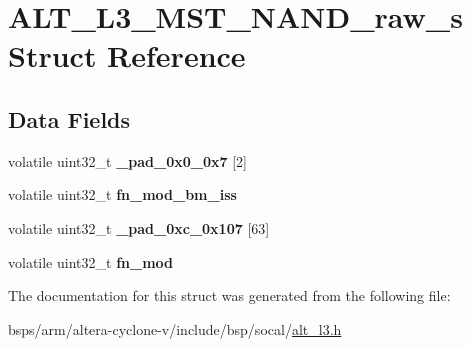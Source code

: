 \hypertarget{structALT__L3__MST__NAND__raw__s}{}\section{A\+L\+T\+\_\+\+L3\+\_\+\+M\+S\+T\+\_\+\+N\+A\+N\+D\+\_\+raw\+\_\+s Struct Reference}
\label{structALT__L3__MST__NAND__raw__s}
\subsection*{Data Fields}
\begin{DoxyCompactItemize}
\item 
\mbox{\label{structALT__L3__MST__NAND__raw__s_aea9acac62b14747cb77a1c8fa6cee2b5}} 
volatile uint32\+\_\+t {\bfseries \+\_\+pad\+\_\+0x0\+\_\+0x7} \mbox{[}2\mbox{]}
\item 
\mbox{\label{structALT__L3__MST__NAND__raw__s_ad0fd714104a0412529e4962d7c7ccb75}} 
volatile uint32\+\_\+t {\bfseries fn\+\_\+mod\+\_\+bm\+\_\+iss}
\item 
\mbox{\label{structALT__L3__MST__NAND__raw__s_aef45d7c0b5be119b68a8600c96d7f5ca}} 
volatile uint32\+\_\+t {\bfseries \+\_\+pad\+\_\+0xc\+\_\+0x107} \mbox{[}63\mbox{]}
\item 
\mbox{\label{structALT__L3__MST__NAND__raw__s_a242b4cb41770c9b950aa1fdf60f339f0}} 
volatile uint32\+\_\+t {\bfseries fn\+\_\+mod}
\end{DoxyCompactItemize}


The documentation for this struct was generated from the following file\+:\begin{DoxyCompactItemize}
\item 
bsps/arm/altera-\/cyclone-\/v/include/bsp/socal/\mbox{\hyperlink{alt__l3_8h}{alt\+\_\+l3.\+h}}\end{DoxyCompactItemize}
